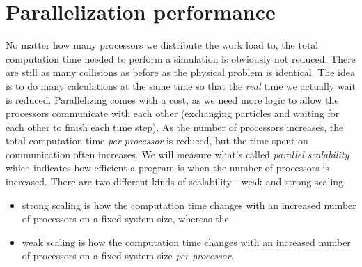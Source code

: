 \section{Parallelization performance}
\label{sec:dsmc_parallelization_performance}
No matter how many processors we distribute the work load to, the total computation time needed to perform a simulation is obviously not reduced. There are still as many collisions as before as the physical problem is identical. The idea is to do many calculations at the same time so that the \textit{real} time we actually wait is reduced. Parallelizing comes with a cost, as we need more logic to allow the processors communicate with each other (exchanging particles and waiting for each other to finish each time step). As the number of processors increases, the total computation time \textit{per processor} is reduced, but the time spent on communication often increases. We will measure what's called \textit{parallel scalability} which indicates how efficient a program is when the number of processors is increased. There are two different kinds of scalability - weak and strong scaling
\begin{itemize}
	\item strong scaling is how the computation time changes with an increased number of processors on a fixed system size, whereas the
	\item weak scaling is how the computation time changes with an increased number of processors on a fixed system size \textit{per processor}.
\end{itemize}
